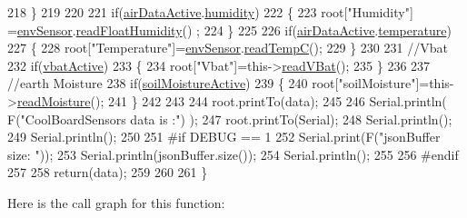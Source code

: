 \begin{DoxyCode}
218     \}
219     
220         
221     \textcolor{keywordflow}{if}(\hyperlink{class_cool_board_sensors_abff8dfeccb2f7689847bb64d5f1cd31e}{airDataActive}.\hyperlink{struct_cool_board_sensors_1_1air_active_ab69738e9fd1c2ba80dc666bcd1e116f7}{humidity}) 
222     \{   
223         root[\textcolor{stringliteral}{"Humidity"}] =\hyperlink{class_cool_board_sensors_a868e38985e9a2412829fa2790ca13e2e}{envSensor}.\hyperlink{class_b_m_e280_a42ea7232039eebf5aadb391ef6132c35}{readFloatHumidity}() ;
224     \}   
225     
226     \textcolor{keywordflow}{if}(\hyperlink{class_cool_board_sensors_abff8dfeccb2f7689847bb64d5f1cd31e}{airDataActive}.\hyperlink{struct_cool_board_sensors_1_1air_active_ac08576736c7ac3bfbfec32e5ee17c686}{temperature})
227     \{
228         root[\textcolor{stringliteral}{"Temperature"}]=\hyperlink{class_cool_board_sensors_a868e38985e9a2412829fa2790ca13e2e}{envSensor}.\hyperlink{class_b_m_e280_afffdd1d7ded9e1f92200e70669019d97}{readTempC}();
229     \}
230     
231     \textcolor{comment}{//Vbat}
232     \textcolor{keywordflow}{if}(\hyperlink{class_cool_board_sensors_ab0b4bbae83796b52b90f91008d383583}{vbatActive})    
233     \{   
234         root[\textcolor{stringliteral}{"Vbat"}]=this->\hyperlink{class_cool_board_sensors_a6944b6ea7bce8e2fce1b434acfd9d5f3}{readVBat}();
235     \}
236     
237     \textcolor{comment}{//earth Moisture}
238     \textcolor{keywordflow}{if}(\hyperlink{class_cool_board_sensors_ae7971bf527781ac4994309591b78ab89}{soilMoistureActive})
239     \{   
240         root[\textcolor{stringliteral}{"soilMoisture"}]=this->\hyperlink{class_cool_board_sensors_a8761bff50373c485f4465c8db47d0633}{readMoisture}();
241     \}
242     
243     
244     root.printTo(data);
245 
246     Serial.println( F(\textcolor{stringliteral}{"CoolBoardSensors data is :"}) );
247     root.printTo(Serial);
248     Serial.println();
249     Serial.println();
250 
251 \textcolor{preprocessor}{#if DEBUG == 1}
252     Serial.print(F(\textcolor{stringliteral}{"jsonBuffer size: "}));
253     Serial.println(jsonBuffer.size());
254     Serial.println();
255 
256 \textcolor{preprocessor}{#endif}
257 
258     \textcolor{keywordflow}{return}(data);   
259     
260 
261 \}
\end{DoxyCode}
Here is the call graph for this function\+:\nopagebreak
